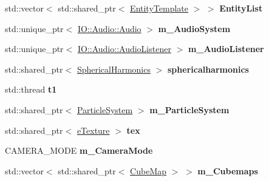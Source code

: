 \begin{DoxyCompactItemize}
\item 
std\+::vector$<$ std\+::shared\+\_\+ptr$<$ \hyperlink{class_entity_template}{Entity\+Template} $>$ $>$ {\bfseries Entity\+List}\hypertarget{class_epsilon_a5bbbefe4de05db9e3a210447e7e341fa}{}\label{class_epsilon_a5bbbefe4de05db9e3a210447e7e341fa}

\item 
std\+::unique\+\_\+ptr$<$ \hyperlink{class_i_o_1_1_audio_1_1_audio}{I\+O\+::\+Audio\+::\+Audio} $>$ {\bfseries m\+\_\+\+Audio\+System}\hypertarget{class_epsilon_ad99e81e15f261af8afd61083dc314434}{}\label{class_epsilon_ad99e81e15f261af8afd61083dc314434}

\item 
std\+::unique\+\_\+ptr$<$ \hyperlink{class_i_o_1_1_audio_1_1_audio_listener}{I\+O\+::\+Audio\+::\+Audio\+Listener} $>$ {\bfseries m\+\_\+\+Audio\+Listener}\hypertarget{class_epsilon_a1023b5f96256fcdfe0efdd408dcf6ecd}{}\label{class_epsilon_a1023b5f96256fcdfe0efdd408dcf6ecd}

\item 
std\+::shared\+\_\+ptr$<$ \hyperlink{class_spherical_harmonics}{Spherical\+Harmonics} $>$ {\bfseries sphericalharmonics}\hypertarget{class_epsilon_a4a135163eeb3fb82c4fd3737a1060004}{}\label{class_epsilon_a4a135163eeb3fb82c4fd3737a1060004}

\item 
std\+::thread {\bfseries t1}\hypertarget{class_epsilon_a91b0fc4ff62151b96af0100e3afdb4b9}{}\label{class_epsilon_a91b0fc4ff62151b96af0100e3afdb4b9}

\item 
std\+::shared\+\_\+ptr$<$ \hyperlink{class_particle_system}{Particle\+System} $>$ {\bfseries m\+\_\+\+Particle\+System}\hypertarget{class_epsilon_abff74a16bcd1e516ee39a1aaa3d12d71}{}\label{class_epsilon_abff74a16bcd1e516ee39a1aaa3d12d71}

\item 
std\+::shared\+\_\+ptr$<$ \hyperlink{classe_texture}{e\+Texture} $>$ {\bfseries tex}\hypertarget{class_epsilon_a0bd1361123cdeceedcba1af257e5b66f}{}\label{class_epsilon_a0bd1361123cdeceedcba1af257e5b66f}

\item 
C\+A\+M\+E\+R\+A\+\_\+\+M\+O\+DE {\bfseries m\+\_\+\+Camera\+Mode}\hypertarget{class_epsilon_aeb2edd96204e1206a74faabdc22fba80}{}\label{class_epsilon_aeb2edd96204e1206a74faabdc22fba80}

\item 
std\+::vector$<$ std\+::shared\+\_\+ptr$<$ \hyperlink{class_cube_map}{Cube\+Map} $>$ $>$ {\bfseries m\+\_\+\+Cubemaps}\hypertarget{class_epsilon_ae69942651e2334e47772efd53b255615}{}\label{class_epsilon_ae69942651e2334e47772efd53b255615}


\end{DoxyCompactItemize}
